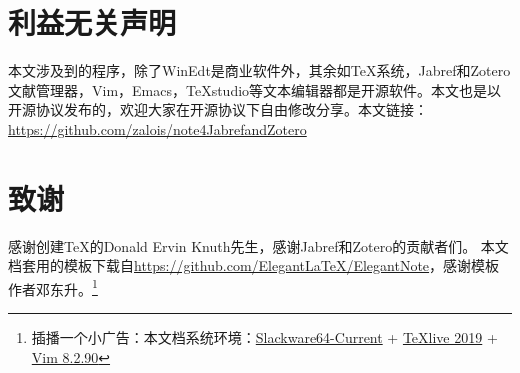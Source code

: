 \documentclass[cn,geye,cyan,normal,14pt]{elegantnote}
\begin{document}
\section{利益无关声明}
本文涉及到的程序，除了WinEdt是商业软件外，其余如\TeX 系统，Jabref和Zotero文献管理器，Vim，Emacs，\TeX studio等文本编辑器都是开源软件。本文也是以开源协议发布的，欢迎大家在开源协议下自由修改分享。本文链接：\url{https://github.com/zalois/note4JabrefandZotero}
\section{致谢}
感谢创建\TeX 的Donald Ervin Knuth先生，感谢Jabref和Zotero的贡献者们。
本文档套用的模板下载自\href{https://github.com/ElegantLaTeX/ElegantNote}{https://github.com/Elegant\LaTeX/ElegantNote}，感谢模板作者邓东升。\footnote{插播一个小广告：本文档系统环境：\href{https://mirrors.slackware.com/slackware/slackware64-current/}{Slackware64-Current} + \href{https://www.tug.org/texlive/}{\TeX live 2019} + \href{https://www.vim.org/}{Vim 8.2.90}}
%

\end{document}
